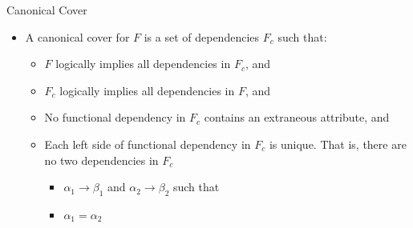 \documentclass{beamer}
\begin{document}
\begin{frame}{Canonical Cover}
    \begin{itemize}
        \item A canonical cover for $F$ is a set of dependencies $F_c$ such that:
            \begin{itemize}
                \item $F$ logically implies all dependencies in $F_c$, and
                \item $F_c$ logically implies all dependencies in $F$, and
                \item No functional dependency in $F_c$ contains an extraneous attribute, and
                \item Each left side of functional dependency in $F_c$ is unique.  That is, there are no two dependencies in $F_c$
                    \begin{itemize}
                        \item $\alpha_1 \rightarrow \beta_1$ and $\alpha_2 \rightarrow \beta_2$ such that
                        \item $\alpha_1 = \alpha_2$
                    \end{itemize}
            \end{itemize}
    \end{itemize}
\end{frame}
\end{document}
